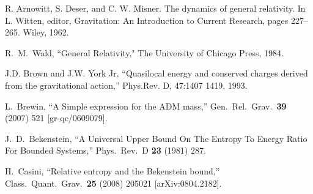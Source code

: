 \documentclass[a4paper,12pt]{article}
\begin{document}
\begin{thebibliography}{100}
 R. Arnowitt, S. Deser, and C. W. Misner. The dynamics of general relativity. In L. Witten, editor, Gravitation: An Introduction to Current Research, pages 227--265. Wiley, 1962.


R.~M.~Wald,
``General Relativity,"
The University of Chicago Press, 1984.


 
  
  J.D. Brown and J.W. York Jr, ``Quasilocal energy and conserved charges derived from the gravitational action,'' Phys.Rev. D, 47:1407  1419, 1993.


  L.~Brewin,
  ``A Simple expression for the ADM mass,''
  Gen.\ Rel.\ Grav.\  {\bf 39} (2007) 521
  [gr-qc/0609079].

 J.~D.~Bekenstein,
 ``A Universal Upper Bound On The Entropy To Energy Ratio For Bounded
 Systems,''
 Phys.\ Rev.\  D {\bf 23} (1981) 287.
 

  H.~Casini,
  ``Relative entropy and the Bekenstein bound,''
  Class.\ Quant.\ Grav.\  {\bf 25} (2008) 205021
  [arXiv:0804.2182].












\end{thebibliography}
\end{document}
